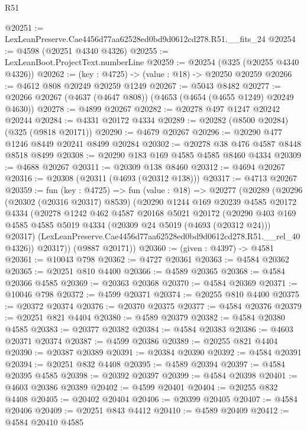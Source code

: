 \begin{lexlean}{R51}
\begin{coremodule}
@20251 := LexLeanPreserve.Cae4456d77aa62528ed0bd9d0612cd278.R51.__fits_24
@20254 := @4598 (@20251 @4340 @4326)
@20255 := LexLeanBoot.ProjectText.numberLine
@20259 := @20254 (@325 (@20255 @4340 @4326))
@20262 := (key : @4725) -> (value : @18) -> @20250 @20259
@20266 := @4612 @808 @20249 @20259 @1249
@20267 := @5043 @8482
@20277 := @20266 @20267 (@4637 (@4647 @808)) (@4653 (@4654 (@4655 @1249) @20249 @4630))
@20278 := @4899 @20267
@20282 := @20278 @497 @1247 @20242 @20244
@20284 := @4331 @20172 @4334
@20289 := @20282 (@8500 @20284) (@325 (@9818 @20171))
@20290 := @4679 @20267
@20296 := @20290 @477 @1246 @8449 @20241 @8499 @20284
@20302 := @20278 @38 @476 @4587 @8448 @8518 @8499
@20308 := @20290 @183 @169 @4585 @4585 @8460 @4334
@20309 := @4688 @20267
@20311 := @20309 @138 @8460
@20312 := @4694 @20267
@20316 := @20308 (@20311 (@4693 (@20312 @138)))
@20317 := @4713 @20267
@20359 := fun (key : @4725) =>
  fun (value : @18) =>
  @20277
    (@20289
      (@20296
        (@20302 (@20316 @20317) @8539)
        (@20290
          @1244
          @169
          @20239
          @4585
          @20172
          @4334
          (@20278
            @1242
            @462
            @4587
            @20168
            @5021
            @20172
            (@20290
              @403
              @169
              @4585
              @4585
              @5019
              @4334
              (@20309 @24 @5019 (@4693 (@20312 @24)))
              @20317)
            (LexLeanPreserve.Cae4456d77aa62528ed0bd9d0612cd278.R51.__rel_40 @4326))
          @20317))
      (@9887 @20171))
@20360 := (given : @4397) -> @4581
@20361 := @10043 @798
@20362 := @4727 @20361
@20363 := @4584 @20362
@20365 := @20251 @810 @4400
@20366 := @4589 @20365
@20368 := @4584 @20366 @4585
@20369 := @20363 @20368
@20370 := @4584 @20369
@20371 := @10046 @798
@20372 := @4599 @20371
@20374 := @20255 @810 @4400
@20375 := @20372 @20374
@20376 := @20370 @20375
@20377 := @4584 @20376
@20379 := @20251 @821 @4404
@20380 := @4589 @20379
@20382 := @4584 @20380 @4585
@20383 := @20377 @20382
@20384 := @4584 @20383
@20386 := @4603 @20371 @20374
@20387 := @4599 @20386
@20389 := @20255 @821 @4404
@20390 := @20387 @20389
@20391 := @20384 @20390
@20392 := @4584 @20391
@20394 := @20251 @832 @4408
@20395 := @4589 @20394
@20397 := @4584 @20395 @4585
@20398 := @20392 @20397
@20399 := @4584 @20398
@20401 := @4603 @20386 @20389
@20402 := @4599 @20401
@20404 := @20255 @832 @4408
@20405 := @20402 @20404
@20406 := @20399 @20405
@20407 := @4584 @20406
@20409 := @20251 @843 @4412
@20410 := @4589 @20409
@20412 := @4584 @20410 @4585

\end{coremodule}
\end{lexlean}
